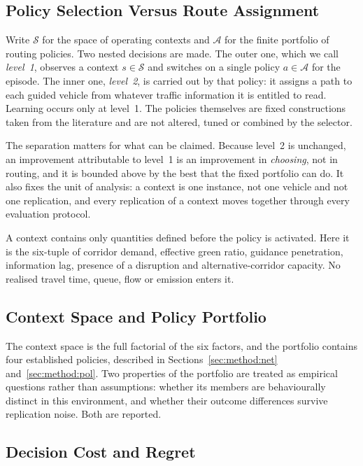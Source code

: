 \documentclass[preprint,12pt]{elsarticle}
\begin{document}
\subsection{Policy Selection Versus Route Assignment}
\label{sec:problem:levels}

Write $\mathcal{S}$ for the space of operating contexts and $\mathcal{A}$ for the
finite portfolio of routing policies. Two nested decisions are made. The outer
one, which we call \emph{level~1}, observes a context $s \in \mathcal{S}$ and
switches on a single policy $a \in \mathcal{A}$ for the episode. The inner one,
\emph{level~2}, is carried out by that policy: it assigns a path to each guided
vehicle from whatever traffic information it is entitled to read. Learning
occurs only at level~1. The policies themselves are fixed constructions taken
from the literature and are not altered, tuned or combined by the selector.

The separation matters for what can be claimed. Because level~2 is unchanged, an
improvement attributable to level~1 is an improvement in \emph{choosing}, not in
routing, and it is bounded above by the best that the fixed portfolio can do. It
also fixes the unit of analysis: a context is one instance, not one vehicle and
not one replication, and every replication of a context moves together through
every evaluation protocol.

A context contains only quantities defined before the policy is activated. Here
it is the six-tuple of corridor demand, effective green ratio, guidance
penetration, information lag, presence of a disruption and alternative-corridor
capacity. No realised travel time, queue, flow or emission enters it.

\subsection{Context Space and Policy Portfolio}
\label{sec:problem:space}

The context space is the full factorial of the six factors, and the portfolio
contains four established policies, described in Sections~\ref{sec:method:net}
and~\ref{sec:method:pol}. Two properties of the portfolio are treated as
empirical questions rather than assumptions: whether its members are
behaviourally distinct in this environment, and whether their outcome
differences survive replication noise. Both are reported.

\subsection{Decision Cost and Regret}
\label{sec:problem:regret}
\end{document}
